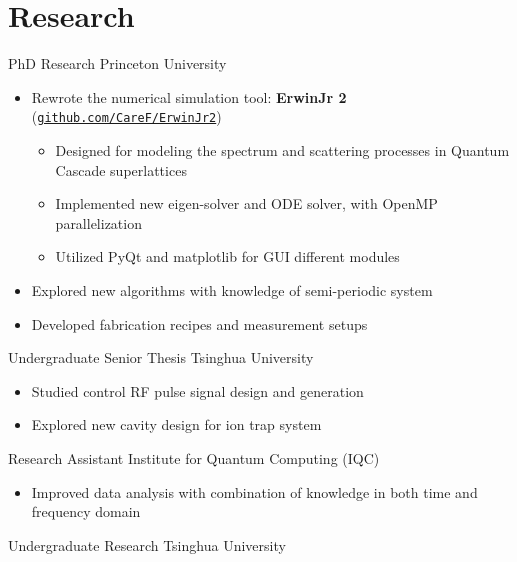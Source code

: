 \documentclass[11pt,letterpaper]{resume}
\begin{document}
\section{Research}
PhD Research \hfill Princeton University
\begin{itemize}
    \item Rewrote the numerical simulation tool:
    \textbf{ErwinJr 2}
    (\href{https://github.com/CareF/ErwinJr2}{\texttt{github.com/CareF/ErwinJr2}})
\begin{itemize}
    \item Designed for modeling the spectrum and scattering processes 
    in Quantum Cascade superlattices
    \item Implemented new eigen-solver and ODE solver, 
    with OpenMP parallelization
    \item Utilized PyQt and matplotlib for GUI
    different modules
\end{itemize}\medskip
    \item Explored new algorithms with knowledge of semi-periodic system
    \item Developed fabrication recipes and measurement setups 
\end{itemize}\medskip

Undergraduate Senior Thesis \hfill Tsinghua University
\begin{itemize}
    \item Studied control RF pulse signal design and generation
    \item Explored new cavity design for ion trap system
\end{itemize}\medskip

Research Assistant \hfill Institute for Quantum Computing (IQC)
\begin{itemize}
    \item Improved data analysis with combination of knowledge in both time and frequency domain
\end{itemize}\medskip

Undergraduate Research \hfill Tsinghua University
\end{document}
